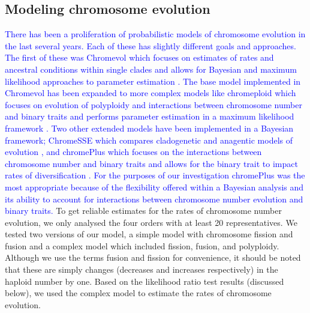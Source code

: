 \documentclass[]{rsos}%
\begin{document}
\subsection{Modeling chromosome evolution}
\textcolor{blue}{There has been a proliferation of probabilistic models of chromosome evolution in the last several years.
Each of these has slightly different goals and approaches.
The first of these was Chromevol which focuses on estimates of rates and ancestral conditions within single clades and allows for Bayesian and maximum likelihood approaches to parameter estimation \cite{mayrose2009chromevol, glick2014chromevol}.
The base model implemented in Chromevol has been expanded to more complex models like chromeploid which focuses on evolution of polyploidy and interactions between chromosome number and binary traits and performs parameter estimation in a maximum likelihood framework \cite{zenil2018chromploid}.
Two other extended models have been implemented in a Bayesian framework; ChromeSSE which compares cladogenetic and anagentic models of evolution \cite{freyman2018}, and chromePlus which focuses on the interactions between chromosome number and binary traits and allows for the binary trait to impact rates of diversification \cite{blackmon2019meiotic}. 
For the purposes of our investigation chromePlus was the most appropriate because of the flexibility offered within a Bayesian analysis and its ability to account for interactions between chromosome number evolution and binary traits\cite{blackmon2019meiotic}.}
To get reliable estimates for the rates of chromosome number evolution, we only analysed the four orders with at least 20 representatives.
We tested two versions of our model, a simple model with chromosome fission and fusion and a complex model which included fission, fusion, and polyploidy.
Although we use the terms fusion and fission for convenience, it should be noted that these are simply changes (decreases and increases respectively) in the haploid number by one.
Based on the likelihood ratio test results (discussed below), we used the complex model to estimate the rates of chromosome evolution.
\end{document}
